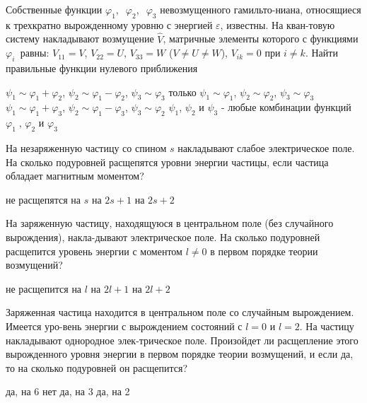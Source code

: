\documentclass[11pt,a4paper]{exam}
\begin{document}
\begin{questions}
\question Собственные функции ${\varphi _1},\;\;{\varphi _2},\;\;{\varphi _3}$ невозмущенного гамильто-ниана, относящиеся к трехкратно вырожденному уровню с энергией $\varepsilon $, известны. На кван-товую систему накладывают возмущение $\hat V$, матричные элементы которого с функциями ${\varphi _{i\;}}$ равны: ${V_{11}} = V$, ${V_{22}} = U$, ${V_{33}} = W$ ($V \ne U \ne W$), ${V_{ik}} = 0$ при $i \ne k$. Найти правильные функции нулевого приближения
\begin{choices}
\choice ${\psi _1} \sim {\varphi _1} + {\varphi _2}$, ${\psi _2} \sim {\varphi _1} - {\varphi _2}$, ${\psi _3} \sim {\varphi _3}$  
\choice только ${\psi _1} \sim {\varphi _1}$, ${\psi _2} \sim {\varphi _2}$, ${\psi _3} \sim {\varphi _3}$
\choice ${\psi _1} \sim {\varphi _1} + {\varphi _3}$, ${\psi _2} \sim {\varphi _1} - {\varphi _3}$, ${\psi _3} \sim {\varphi _2}$  
\choice ${\psi _1}$, ${\psi _2}$ и ${\psi _3}$ - любые комбинации функций ${\varphi _1}\;$, ${\varphi _2}$ и ${\varphi _3}$
\end{choices}

\question На незаряженную частицу со спином $s$ накладывают слабое электрическое поле. На сколько подуровней расщепятся уровни энергии частицы, если частица обладает магнитным моментом?
\begin{choices}
\choice не расщепятся  
\choice на $s$   
\choice на $2s + 1$ 
\choice на $2s + 2$
\end{choices}

\question На заряженную частицу, находящуюся в центральном поле (без случайного вырождения), накла-дывают электрическое поле. На сколько подуровней расщепится уровень энергии с моментом $l \ne 0$ в первом порядке теории возмущений?
\begin{choices}
\choice не расщепится  
\choice на $l$      
\choice на $2l + 1$ 
\choice на $2l + 2$
\end{choices}

\question Заряженная частица находится в центральном поле со случайным вырождением. Имеется уро-вень энергии с вырождением состояний с $l = 0$ и $l = 2$. На частицу накладывают однородное элек-трическое поле. Произойдет ли расщепление этого вырожденного уровня энергии в первом порядке теории возмущений, и если да, то на сколько подуровней он расщепится?
\begin{choices}
\choice да, на 6    
\choice нет      
\choice да, на 3 
\choice да, на 2
\end{choices}


\end{questions}
\end{document}
